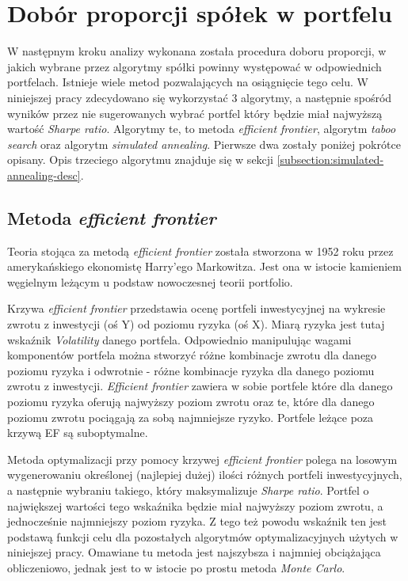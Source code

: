 \documentclass[12pt,a4paper,twoside,openany]{book}
\begin{document}
\section{Dobór proporcji spółek w portfelu}

W następnym kroku analizy wykonana została procedura doboru proporcji, w jakich wybrane przez algorytmy spółki powinny występować w odpowiednich portfelach.
Istnieje wiele metod pozwalających na osiągnięcie tego celu.
W niniejszej pracy zdecydowano się wykorzystać 3 algorytmy, a następnie spośród wyników przez nie sugerowanych wybrać portfel który będzie miał najwyższą wartość \textit{Sharpe ratio}.
Algorytmy te, to metoda \textit{efficient frontier}, algorytm \textit{taboo search} oraz algorytm \textit{simulated annealing}.
Pierwsze dwa zostały poniżej pokrótce opisany.
Opis trzeciego algorytmu znajduje się w sekcji \ref{subsection:simulated-annealing-desc}.

\subsection{Metoda \textit{efficient frontier}}

Teoria stojąca za metodą \textit{efficient frontier} została stworzona w 1952 roku przez amerykańskiego ekonomistę Harry'ego Markowitza.
Jest ona w istocie kamieniem węgielnym leżącym u podstaw nowoczesnej teorii portfolio.

Krzywa \textit{efficient frontier} przedstawia ocenę portfeli inwestycyjnej na wykresie zwrotu z inwestycji (oś Y) od poziomu ryzyka (oś X).
Miarą ryzyka jest tutaj wskaźnik \textit{Volatility} danego portfela.
Odpowiednio manipulując wagami komponentów portfela można stworzyć różne kombinacje zwrotu dla danego poziomu ryzyka i odwrotnie - różne kombinacje ryzyka dla danego poziomu zwrotu z inwestycji.
\textit{Efficient frontier} zawiera w sobie portfele które dla danego poziomu ryzyka oferują najwyższy poziom zwrotu oraz te, które dla danego poziomu zwrotu pociągają za sobą najmniejsze ryzyko.
Portfele leżące poza krzywą EF są suboptymalne.

Metoda optymalizacji przy pomocy krzywej \textit{efficient frontier} polega na losowym wygenerowaniu określonej (najlepiej dużej) ilości różnych portfeli inwestycyjnych, a następnie wybraniu takiego, który maksymalizuje \textit{Sharpe ratio}.
Portfel o największej wartości tego wskaźnika będzie miał najwyższy poziom zwrotu, a jednocześnie najmniejszy poziom ryzyka.
Z tego też powodu wskaźnik ten jest podstawą funkcji celu dla pozostałych algorytmów optymalizacyjnych użytych w niniejszej pracy.
Omawiane tu metoda jest najszybsza i najmniej obciążająca obliczeniowo, jednak jest to w istocie po prostu metoda \textit{Monte Carlo}.
\end{document}
